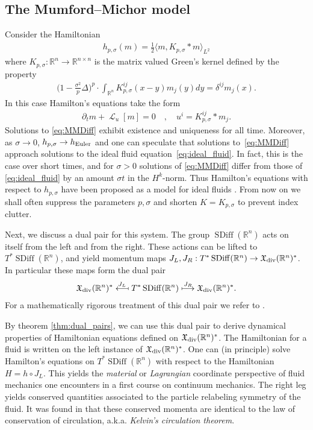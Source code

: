 \documentclass[12pt]{amsart}
\newcommand{\R}{\ensuremath{\mathbb{R}}}
\DeclareMathOperator{\SDiff}{SDiff}
\DeclareMathOperator{\lie}{\mathcal{L}}
\begin{document}
\subsection{The Mumford--Michor model}
\label{sec:MME}
Consider the Hamiltonian
\begin{align*}
  h_{p,\sigma}(m) = \frac{1}{2} \langle m , K_{p,\sigma} * m \rangle_{L^2}
\end{align*}
where $K_{p,\sigma}:\R^n \to \mathbb{R}^{n \times n}$ is the matrix
valued Green's kernel defined by the property
\begin{align*}
 \Big(1 - \frac{\sigma^2}{p} \Delta \Big)^p \cdot \int_{\R^n} K_{p,\sigma}^{ij}(x - y) m_j(y) dy = \delta^{ij} m_j(x).
\end{align*}
In this case Hamilton's equations take the form
\begin{align}
	\partial_t m+ \lie_u [ m] = 0 \quad , \quad u^i  = K^{ij}_{p,\sigma} * m_j. \label{eq:MMDiff}
\end{align}
Solutions to \eqref{eq:MMDiff} exhibit existence and uniqueness for all time.
Moreover, as $\sigma \to 0$, $h_{p,\sigma} \to h_{\rm Euler}$ and one
can speculate that solutions to~\eqref{eq:MMDiff}
approach solutions to the ideal fluid equation~\eqref{eq:ideal_fluid}.
In fact, this is the case over short times, and for $\sigma > 0$ solutions of \eqref{eq:MMDiff}
differ from those of \eqref{eq:ideal_fluid} by an amount $\sigma t$
in the $H^k$-norm.
Thus Hamilton's equations with respect to $h_{p,\sigma}$ have been proposed
as a model for ideal fluids \cite[Theorems 2 and 3]{MumfordMichor2013}. From now on we shall often suppress the
parameters $p,\sigma$ and shorten $K = K_{p,\sigma}$ to prevent index
clutter.

Next, we discuss a dual pair for this system.
The group $\SDiff(\R^n)$ acts on itself from the left and from the right.
These actions can be lifted to $T^* \SDiff(\R^n)$, and yield
momentum maps $J_L,J_R : T^*\SDiff(\R^n) \to \mathfrak{X}_{\rm div}(\R^n)^*$. In particular these maps form the dual pair
\begin{align*}
  \mathfrak{X}_{\rm div}(\R^n)^*
  \stackrel{J_L}{\longmapsfrom}
  T^* \SDiff(\R^n)
  \stackrel{J_R}{\longmapsto}
  \mathfrak{X}_{\rm div}(\R^n)^*.
\end{align*}
For a mathematically rigorous treatment of this dual pair we refer to \cite{GayBalmazVizman2012}.

By theorem \ref{thm:dual_pairs}, we can use this dual pair to derive dynamical properties of Hamiltonian equations defined on $\mathfrak{X}_{\rm div}(\R^n)^*$.
The Hamiltonian for a fluid is written on the left instance of $\mathfrak{X}_{\rm div}(\R^n)^*$.
One can (in principle) solve Hamilton's equations on $T^*\SDiff(\R^n)$
with respect to the Hamiltonian $H = h \circ J_L$.
This yields the \emph{material} or \emph{Lagrangian} coordinate perspective
of fluid mechanics one encounters in a first course on continuum
mechanics.
The right leg yields conserved quantities associated to the particle relabeling symmetry of the fluid.
It was found in \cite{Arnold1966} that these conserved momenta are identical
to the law of conservation of circulation, a.k.a. \emph{Kelvin's circulation theorem}.
\end{document}
